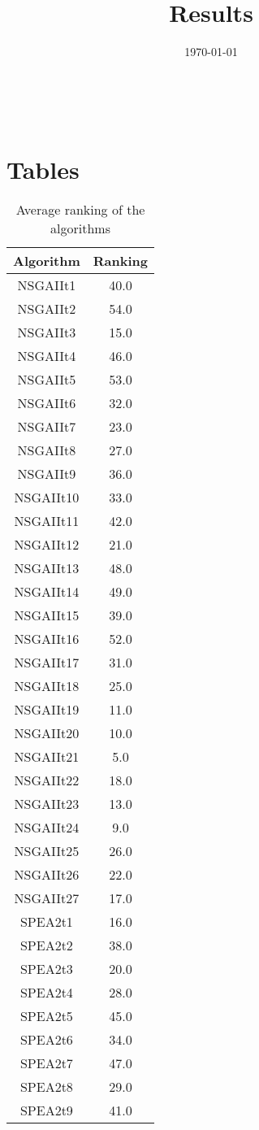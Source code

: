 \documentclass{article}
\title{Results}
\author{}
\date{\today}
\begin{document}
\oddsidemargin 0in \topmargin 0in\maketitle
\
\section{Tables}
\begin{table}[!htp]
\centering
\caption{Average ranking of the algorithms}
\begin{tabular}{c|c}
Algorithm&Ranking\\
\hline
NSGAIIt1&40.0\\
NSGAIIt2&54.0\\
NSGAIIt3&15.0\\
NSGAIIt4&46.0\\
NSGAIIt5&53.0\\
NSGAIIt6&32.0\\
NSGAIIt7&23.0\\
NSGAIIt8&27.0\\
NSGAIIt9&36.0\\
NSGAIIt10&33.0\\
NSGAIIt11&42.0\\
NSGAIIt12&21.0\\
NSGAIIt13&48.0\\
NSGAIIt14&49.0\\
NSGAIIt15&39.0\\
NSGAIIt16&52.0\\
NSGAIIt17&31.0\\
NSGAIIt18&25.0\\
NSGAIIt19&11.0\\
NSGAIIt20&10.0\\
NSGAIIt21&5.0\\
NSGAIIt22&18.0\\
NSGAIIt23&13.0\\
NSGAIIt24&9.0\\
NSGAIIt25&26.0\\
NSGAIIt26&22.0\\
NSGAIIt27&17.0\\
SPEA2t1&16.0\\
SPEA2t2&38.0\\
SPEA2t3&20.0\\
SPEA2t4&28.0\\
SPEA2t5&45.0\\
SPEA2t6&34.0\\
SPEA2t7&47.0\\
SPEA2t8&29.0\\
SPEA2t9&41.0\\

\end{tabular}
\end{table}
\end{document}
